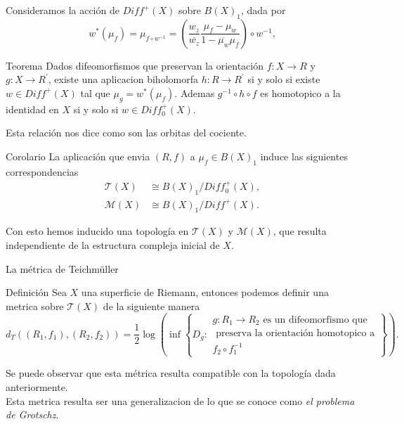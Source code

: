 \documentclass[xcolor=dvipsnames,10pt]{beamer}
\begin{document}
\begin{frame}
    Consideramos la acción de $Diff^+(X)$ sobre $B(X)_1$, dada por
    $$w^*(\mu_f)=\mu_{f\circ w^{-1}}=\left(\frac{w_z}{\overline{w_z}}\frac{\mu_f-\mu_w}{1-\overline{\mu_w}\mu_f}\right)\circ w^{-1},$$
    \begin{block}{Teorema}
        Dados difeomorfismos que preservan la orientación $f:X\to R$ y $g:X\to R^\prime$, existe una aplicacion biholomorfa $h:R\to R^\prime$ si y solo si existe $w\in Diff^+(X)$ tal que $\mu_g=w^*(\mu_f).$ Ademas $g^{-1}\circ h\circ f$ es homotopico a la identidad en $X$ si y solo si $w\in Diff_0^+(X).$ 
    \end{block}
    Esta relación nos dice como son las orbitas del cociente.
    \begin{block}{Corolario}
        La aplicación que envia $(R,f)$ a $\mu_f\in B(X)_1$ induce las siguientes correspondencias
        \begin{align*}
           \mathcal{T}(X)&\cong B(X)_1/Diff_0^+(X),\\
           \mathcal{M}(X)&\cong B(X)_1/Diff^+(X). 
        \end{align*}
    \end{block}
    Con esto hemos inducido una topología en $\mathcal{T}(X)$ y $\mathcal{M}(X)$, que resulta independiente de la estructura compleja inicial de $X.$
\end{frame}
\begin{frame}{La métrica de Teichmüller}
\begin{block}{Definición}
    Sea $X$ una superficie de Riemann, entonces podemos definir una metrica sobre $\mathcal{T}(X)$ de la siguiente manera
    $$d_T((R_1,f_1),(R_2,f_2))=\frac{1}{2}\log\left(\inf\left\{D_g:\begin{array}{c} g:R_1\to R_2 \text{ es un difeomorfismo que}\\\text{ preserva la orientación homotopico a}\\f_2\circ f_1^{-1}\end{array}\right\}\right).$$
\end{block}
Se puede observar que esta métrica resulta compatible con la topología dada anteriormente.\\

Esta metrica resulta ser una generalizacion de lo que se conoce como \textit{el problema de Grotschz}.
    
\end{frame}
\end{document}
